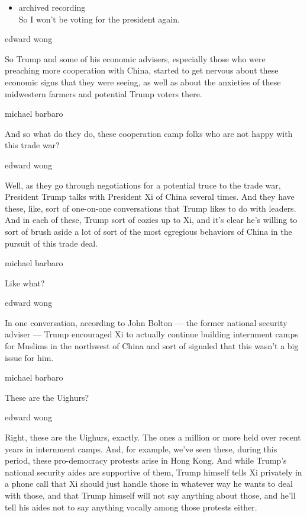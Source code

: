 \begin{itemize}
\tightlist
\item
  archived recording\\
  So I won't be voting for the president again.
\end{itemize}

edward wong

So Trump and some of his economic advisers, especially those who were
preaching more cooperation with China, started to get nervous about
these economic signs that they were seeing, as well as about the
anxieties of these midwestern farmers and potential Trump voters there.

michael barbaro

And so what do they do, these cooperation camp folks who are not happy
with this trade war?

edward wong

Well, as they go through negotiations for a potential truce to the trade
war, President Trump talks with President Xi of China several times. And
they have these, like, sort of one-on-one conversations that Trump likes
to do with leaders. And in each of these, Trump sort of cozies up to Xi,
and it's clear he's willing to sort of brush aside a lot of sort of the
most egregious behaviors of China in the pursuit of this trade deal.

michael barbaro

Like what?

edward wong

In one conversation, according to John Bolton --- the former national
security adviser --- Trump encouraged Xi to actually continue building
internment camps for Muslims in the northwest of China and sort of
signaled that this wasn't a big issue for him.

michael barbaro

These are the Uighurs?

edward wong

Right, these are the Uighurs, exactly. The ones a million or more held
over recent years in internment camps. And, for example, we've seen
these, during this period, these pro-democracy protests arise in Hong
Kong. And while Trump's national security aides are supportive of them,
Trump himself tells Xi privately in a phone call that Xi should just
handle those in whatever way he wants to deal with those, and that Trump
himself will not say anything about those, and he'll tell his aides not
to say anything vocally among those protests either.

